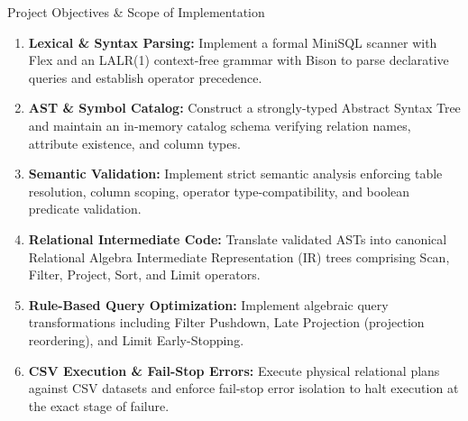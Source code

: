 \documentclass[aspectratio=169,10pt]{beamer}
\begin{document}
\begin{frame}{Project Objectives \& Scope of Implementation}
    \begin{enumerate}\small
        \item \textbf{Lexical \& Syntax Parsing:} Implement a formal MiniSQL scanner with Flex and an LALR(1) context-free grammar with Bison to parse declarative queries and establish operator precedence.
        \item \textbf{AST \& Symbol Catalog:} Construct a strongly-typed Abstract Syntax Tree and maintain an in-memory catalog schema verifying relation names, attribute existence, and column types.
        \item \textbf{Semantic Validation:} Implement strict semantic analysis enforcing table resolution, column scoping, operator type-compatibility, and boolean predicate validation.
        \item \textbf{Relational Intermediate Code:} Translate validated ASTs into canonical Relational Algebra Intermediate Representation (IR) trees comprising Scan, Filter, Project, Sort, and Limit operators.
        \item \textbf{Rule-Based Query Optimization:} Implement algebraic query transformations including Filter Pushdown, Late Projection (projection reordering), and Limit Early-Stopping.
        \item \textbf{CSV Execution \& Fail-Stop Errors:} Execute physical relational plans against CSV datasets and enforce fail-stop error isolation to halt execution at the exact stage of failure.
    \end{enumerate}
\end{frame}
\end{document}
